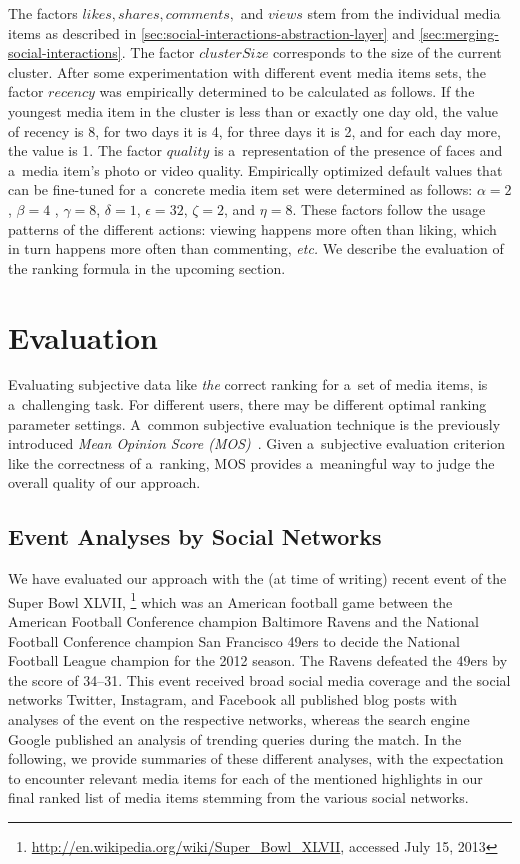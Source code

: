 The factors $ \mathit{likes}, \mathit{shares}, \mathit{comments},$ and $ \mathit{views} $
stem from the individual media items as described in \autoref{sec:social-interactions-abstraction-layer}
and \autoref{sec:merging-social-interactions}.
The factor $ \mathit{clusterSize} $ corresponds to the size of the current cluster. 
After some experimentation with different event media items sets,
the factor $ \mathit{recency} $ was empirically determined to be calculated as follows.
If the youngest media item in the cluster is less than or exactly one day old,
the value of recency is 8, for two days it is 4, for three days it is 2,
and for each day more, the value is 1.
The factor $ \mathit{quality} $ is a~representation of the
presence of faces and a~media item's photo or video quality.
Empirically optimized default values
that can be fine-tuned for a~concrete media item set
were determined as follows:
$ \alpha = 2 $, $ \beta = 4 $ , $ \gamma = 8 $, $ \delta = 1 $,
$ \epsilon = 32 $, $ \zeta = 2 $, and $ \eta = 8 $.
These factors follow the usage patterns of the different actions:
viewing happens more often than liking, which in turn happens more often than commenting, \emph{etc.}
We describe the evaluation of the ranking formula in the upcoming section.

\section{Evaluation}
\label{sec-chapter7-evaluation}

Evaluating subjective data like \emph{the} correct ranking
for a~set of media items, is a~challenging task.
For different users, there may be different optimal ranking parameter settings.
A~common subjective evaluation technique
is the previously introduced \emph{Mean Opinion Score (MOS)}~\cite{itu1998mos}.
Given a~subjective evaluation criterion
like the correctness of a~ranking,
MOS provides a~meaningful way to judge the overall quality of our approach.

\subsection{Event Analyses by Social Networks}

We have evaluated our approach with the (at time of writing)
recent event of the Super Bowl XLVII,%
\footnote{\url{http://en.wikipedia.org/wiki/Super_Bowl_XLVII},
accessed July 15, 2013}
which was an American football game between
the American Football Conference champion Baltimore Ravens
and the National Football Conference champion
San Francisco 49ers to decide the National Football League
champion for the 2012 season.
The Ravens defeated the 49ers by the score of 34--31.
This event received broad social media coverage
and the social networks
Twitter, Instagram, and Facebook all published blog posts
with analyses of the event on the respective networks,
whereas the search engine Google
published an analysis of trending queries during the match.
In the following, we provide summaries of these different analyses,
with the expectation to encounter relevant media items
for each of the mentioned highlights in our final ranked list of media items
stemming from the various social networks.

